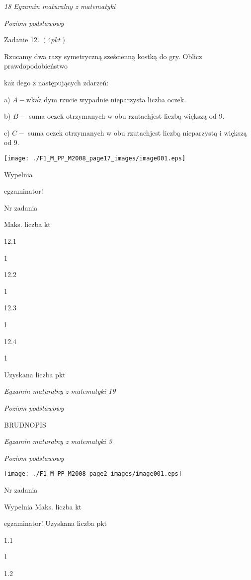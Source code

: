 \documentclass[a4paper,12pt]{article}
\begin{document}
{\it 18 Egzamin maturalny z matematyki}

{\it Poziom podstawowy}

Zadanie 12. $(4pkt)$

Rzucamy dwa razy symetryczną sześcienną kostką do gry. Oblicz prawdopodobieństwo

$\mathrm{k}\mathrm{a}\dot{\mathrm{z}}$ dego z następujących zdarzeń:

a) $A-\mathrm{w}\mathrm{k}\mathrm{a}\dot{\mathrm{z}}$ dym rzucie wypadnie nieparzysta liczba oczek.

b) $B-$ suma oczek otrzymanych w obu rzutachjest liczbą większą od 9.

c) $C-$ suma oczek otrzymanych w obu rzutachjest liczbą nieparzystą i większą od 9.
\begin{center}
\texttt{[image: ./F1\_M\_PP\_M2008\_page17\_images/image001.eps]}
\end{center}
Wypelnia

egzaminator!

Nr zadania

Maks. liczba kt

12.1

1

12.2

1

12.3

1

12.4

1

Uzyskana liczba pkt





{\it Egzamin maturalny z matematyki 19}

{\it Poziom podstawowy}

BRUDNOPIS





{\it Egzamin maturalny z matematyki 3}

{\it Poziom podstawowy}
\begin{center}
\texttt{[image: ./F1\_M\_PP\_M2008\_page2\_images/image001.eps]}
\end{center}
Nr zadania

Wypelnia Maks. liczba kt

egzaminator! Uzyskana liczba pkt

1.1

1

1.2
\end{document}
